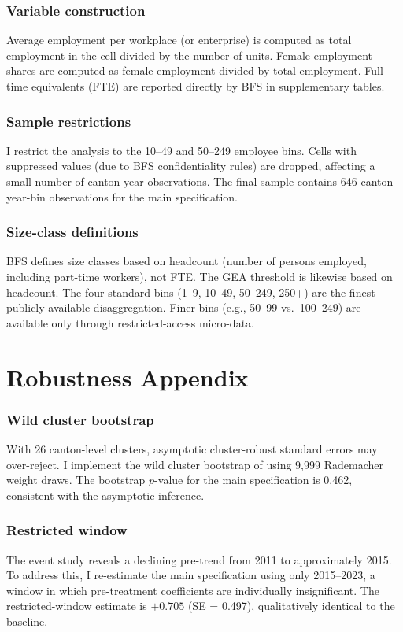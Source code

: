 \documentclass[12pt]{article}
\begin{document}
\subsubsection*{Variable construction} Average employment per workplace (or enterprise) is computed as total employment in the cell divided by the number of units. Female employment shares are computed as female employment divided by total employment. Full-time equivalents (FTE) are reported directly by BFS in supplementary tables.

\subsubsection*{Sample restrictions} I restrict the analysis to the 10--49 and 50--249 employee bins. Cells with suppressed values (due to BFS confidentiality rules) are dropped, affecting a small number of canton-year observations. The final sample contains 646 canton-year-bin observations for the main specification.

\subsubsection*{Size-class definitions} BFS defines size classes based on headcount (number of persons employed, including part-time workers), not FTE. The GEA threshold is likewise based on headcount. The four standard bins (1--9, 10--49, 50--249, 250+) are the finest publicly available disaggregation. Finer bins (e.g., 50--99 vs.\ 100--249) are available only through restricted-access micro-data.


\section{Robustness Appendix}
\label{sec:robustness_appendix}

\subsubsection*{Wild cluster bootstrap} With 26 canton-level clusters, asymptotic cluster-robust standard errors may over-reject. I implement the wild cluster bootstrap of \citet{cameron2008bootstrap} using 9,999 Rademacher weight draws. The bootstrap $p$-value for the main specification is 0.462, consistent with the asymptotic inference.

\subsubsection*{Restricted window} The event study reveals a declining pre-trend from 2011 to approximately 2015. To address this, I re-estimate the main specification using only 2015--2023, a window in which pre-treatment coefficients are individually insignificant. The restricted-window estimate is $+0.705$ (SE = 0.497), qualitatively identical to the baseline.
\end{document}
